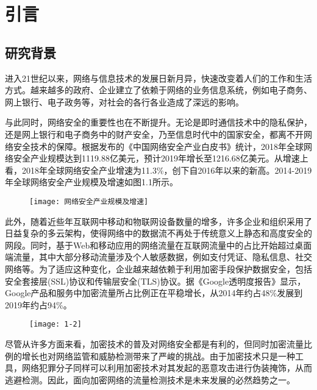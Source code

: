 \chapter{引言}\label{chap:introduction}
\section{研究背景}
进入21世纪以来，网络与信息技术的发展日新月异，快速改变着人们的工作和生活方式。越来越多的政府、企业建立了依赖于网络的业务信息系统，例如电子商务、网上银行、电子政务等，对社会的各行各业造成了深远的影响。

与此同时，网络安全的重要性也在不断提升。无论是即时通信技术中的隐私保护，还是网上银行和电子商务中的财产安全，乃至信息时代中的国家安全，都离不开网络安全技术的保障。根据\cite{xintong2019zhong}发布的《中国网络安全产业白皮书》统计，2018年全球网络安全产业规模达到1119.88亿美元，预计2019年增长至1216.68亿美元。从增速上看，2018年全球网络安全产业增速为11.3\%，创下自2016年以来的新高。2014-2019年全球网络安全产业规模及增速如图1.1所示。
\begin{figure}[!htbp]
    \centering
    \texttt{[image: 网络安全产业规模及增速]}
\end{figure}

此外，随着近些年互联网中移动和物联网设备数量的增多，许多企业和组织采用了日益复杂的多云架构，使得网络中的数据流不再处于传统意义上静态和高度安全的网段。同时，基于Web和移动应用的网络流量在互联网流量中的占比开始超过桌面端流量，其中大部分移动流量涉及个人敏感数据，例如支付凭证、隐私信息、社交网络等。为了适应这种变化，企业越来越依赖于利用加密手段保护数据安全，包括安全套接层(SSL)协议和传输层安全(TLS)协议。据《Google透明度报告》显示，Google产品和服务中加密流量所占比例正在平稳增长，从2014年约占48\%发展到2019年约占94\%。

\begin{figure}[!htbp]
    \centering
    \texttt{[image: 1-2]}
\end{figure}

尽管从许多方面来看，加密技术的普及对网络安全都是有利的，但同时加密流量比例的增长也对网络监管和威胁检测带来了严峻的挑战。由于加密技术只是一种工具，网络犯罪分子同样可以利用加密技术对其发起的恶意攻击进行伪装掩饰，从而逃避检测。因此，面向加密网络的流量检测技术是未来发展的必然趋势之一。

